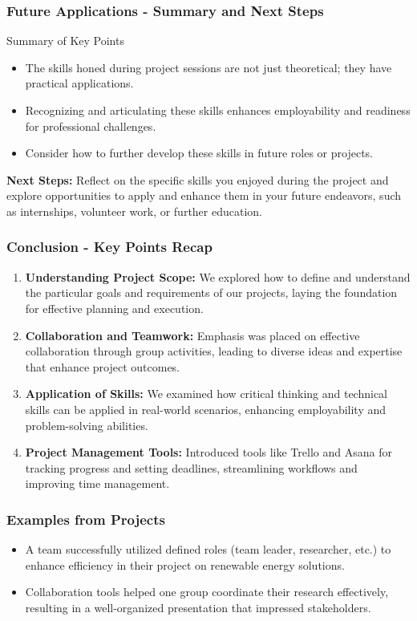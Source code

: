 \documentclass[aspectratio=169]{beamer}
\begin{document}
\begin{frame}[fragile]
  \frametitle{Future Applications - Summary and Next Steps}
  \begin{block}{Summary of Key Points}
    \begin{itemize}
      \item The skills honed during project sessions are not just theoretical; they have practical applications.
      \item Recognizing and articulating these skills enhances employability and readiness for professional challenges.
      \item Consider how to further develop these skills in future roles or projects.
    \end{itemize}
  \end{block}
  
  \textbf{Next Steps:} Reflect on the specific skills you enjoyed during the project and explore opportunities to apply and enhance them in your future endeavors, such as internships, volunteer work, or further education.
\end{frame}

\begin{frame}[fragile]
  \frametitle{Conclusion - Key Points Recap}
  \begin{enumerate}
    \item \textbf{Understanding Project Scope:}  
    We explored how to define and understand the particular goals and requirements of our projects, laying the foundation for effective planning and execution.
    
    \item \textbf{Collaboration and Teamwork:}  
    Emphasis was placed on effective collaboration through group activities, leading to diverse ideas and expertise that enhance project outcomes.
    
    \item \textbf{Application of Skills:}  
    We examined how critical thinking and technical skills can be applied in real-world scenarios, enhancing employability and problem-solving abilities.
    
    \item \textbf{Project Management Tools:}  
    Introduced tools like Trello and Asana for tracking progress and setting deadlines, streamlining workflows and improving time management.
  \end{enumerate}
\end{frame}

\begin{frame}[fragile]
  \frametitle{Examples from Projects}
  \begin{itemize}
    \item A team successfully utilized defined roles (team leader, researcher, etc.) to enhance efficiency in their project on renewable energy solutions.
    \item Collaboration tools helped one group coordinate their research effectively, resulting in a well-organized presentation that impressed stakeholders.
  \end{itemize}
\end{frame}
\end{document}
